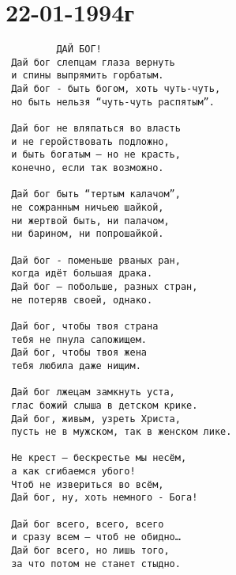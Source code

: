 \chapter{22-01-1994г}

\begin{verbatim}
         ДАЙ БОГ!
 Дай бог слепцам глаза вернуть
 и спины выпрямить горбатым.
 Дай бог - быть богом, хоть чуть-чуть,
 но быть нельзя “чуть-чуть распятым”.

 Дай бог не вляпаться во власть
 и не геройствовать подложно,
 и быть богатым — но не красть,
 конечно, если так возможно.

 Дай бог быть “тертым калачом”,
 не сожранным ничьею шайкой,
 ни жертвой быть, ни палачом,
 ни барином, ни попрошайкой.

 Дай бог - поменьше рваных ран,
 когда идёт большая драка.
 Дай бог – побольше, разных стран,
 не потеряв своей, однако.

 Дай бог, чтобы твоя страна
 тебя не пнула сапожищем.
 Дай бог, чтобы твоя жена
 тебя любила даже нищим.

 Дай бог лжецам замкнуть уста,
 глас божий слыша в детском крике.
 Дай бог, живым, узреть Христа,
 пусть не в мужском, так в женском лике.

 Не крест — бескрестье мы несём,
 а как сгибаемся убого!
 Чтоб не извериться во всём,
 Дай бог, ну, хоть немного - Бога!

 Дай бог всего, всего, всего
 и сразу всем — чтоб не обидно…
 Дай бог всего, но лишь того,
 за что потом не станет стыдно. 
\end{verbatim}
\author{Евгений Евтушенко}

